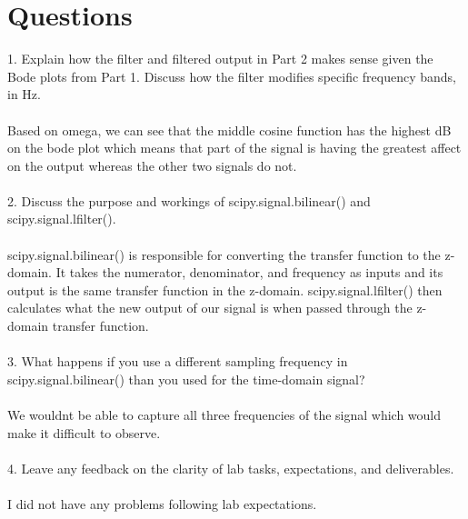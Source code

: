 \documentclass[12pt]{report}
\begin{document}
\section{Questions}
1. Explain how the filter and filtered output in Part 2 makes sense given the Bode plots from Part 1. Discuss how the filter modifies specific frequency bands, in Hz.
\\\\
Based on omega, we can see that the middle cosine function has the highest dB on the bode plot which means that part of the signal is having the greatest affect on the output whereas the other two signals do not.
\\\\
2. Discuss the purpose and workings of scipy.signal.bilinear() and scipy.signal.lfilter().
\\\\
scipy.signal.bilinear() is responsible for converting the transfer function to the z-domain. It takes the numerator, denominator, and frequency as inputs and its output is the same transfer function in the z-domain. scipy.signal.lfilter() then calculates what the new output of our signal is when passed through the z-domain transfer function.
\\\\
3. What happens if you use a different sampling frequency in scipy.signal.bilinear() than you used for the time-domain signal?
\\\\
We wouldnt be able to capture all three frequencies of the signal which would make it difficult to observe.
\\\\
4. Leave any feedback on the clarity of lab tasks, expectations, and deliverables.
\\\\
I did not have any problems following lab expectations.
\end{document}
